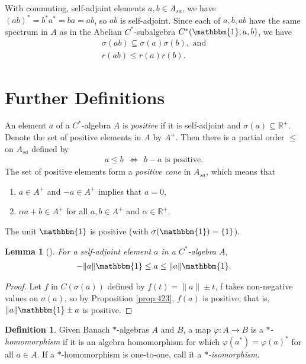 \documentclass[12pt,a4paper]{report}
\theoremstyle{plain}
\newtheorem{lemma}{Lemma}
\theoremstyle{definition}
\newtheorem{defn}{Definition}
\newcommand{\1}{\mathbbm{1}}
\newcommand{\R}{\mathbb{R}}
\renewcommand{\phi}{\varphi}
\newcommand{\spec}[1]{\sigma(#1)}
\begin{document}
With commuting, self-adjoint elements $a,b\in A_{sa}$, we have $(ab)^\ast = b^\ast a^\ast = ba =
ab$, so $ab$ is self-adjoint. Since each of $a,b,ab$ have the same spectrum in $A$ as in the Abelian 
$C^\ast$-subalgebra $C^\ast(\1,a,b)$, we have
\begin{align*}
	\spec{ab} \subseteq \spec{a}\spec{b}, \mbox { and} \\
	r(ab) \leq r(a)r(b).
\end{align*}


\section{Further Definitions}

An element $a$ of a $C^\ast$-algebra $A$ is \emph{positive} if it is self-adjoint and $\spec a
\subseteq \R^+$. 
Denote the set of positive elements in $A$ by $A^+$. Then there is a partial order $\leq$ on 
$A_{sa}$ defined by 
\begin{align*}
	a\leq b ~~\iff~~ b-a \mbox{ is positive}.
\end{align*}
The set of positive elements form a \emph{positive cone} in $A_{sa}$, which means that 
\begin{enumerate}
	\item 	$a\in A^+$ and $-a\in A^+$ implies that $a=0$,
	\item	$\alpha a+b\in A^+$ for all $a,b \in A^+$ and $\alpha\in \R^+$.
\end{enumerate}
The unit $\1$ is positive (with $\spec \1 = \{1\}$). 

\begin{lemma}[{\cite[4.2.3(ii)]{kadison83}}]\label{lemma:423}
	For a self-adjoint element $a$ in a $C^\ast$-algebra $A$, 
	\begin{align*}
		-\|a\|\1\leq a\leq\|a\|\1.
	\end{align*}
\end{lemma}
\begin{proof}
	Let $f$ in $C(\spec a)$ defined by $f(t) = \|a\| \pm t$, f takes non-negative values on $\spec a$, so by Proposition \ref{prop:423}, $f(a)$ is positive; that is, $\|a\|\1 \pm a$ is positive.
\end{proof}
	
\begin{defn}
	Given Banach $\ast$-algebras $A$ and $B$, a map $\phi:A\to B$ is a \emph{$\ast$-homomorphism} 
	if it is an algebra homomorphism for which $\phi(a^\ast) = \phi(a)^\ast$ for all $a \in A$.
	If a $\ast$-homomorphism is one-to-one, call it a \emph{$\ast$-isomorphism}.
\end{defn}
\end{document}
